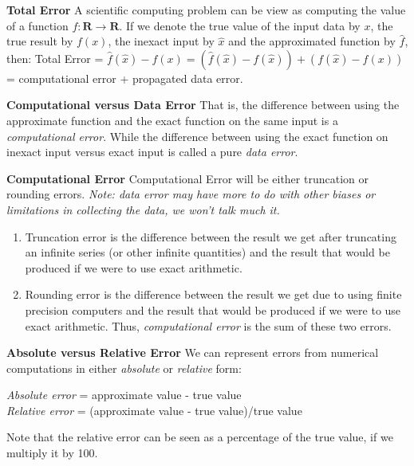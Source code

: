 \documentclass[xcolor=dvipsnames]{beamer}
\begin{document}
\begin{frame}
{\bf Total Error}
A scientific computing problem can be view as computing the value of a function $f: \mathbf{R} \rightarrow \mathbf{R}$.
\vfill
\pause
If we denote the true value of the input data by $x$, the true result by $f(x)$, the inexact input by $\hat{x}$ and the approximated function by $\hat{f}$, then:
\vfill
\pause
Total Error = $\hat{f}(\hat{x}) - f(x) = (\hat{f}(\hat{x}) - f(\hat{x})) + (f(\hat{x}) - f(x))$  = computational error + propagated data error.\\
\end{frame}

\begin{frame}
{\bf Computational versus Data Error}
That is, the difference between using the approximate function and the exact function on the same input is a \emph{computational error}. 
\vfill
\pause
While the difference between using the exact function on inexact input versus exact input is called a pure \emph{data error}.\\
\end{frame}

\begin{frame}
{\bf Computational Error}
Computational Error will be either truncation or rounding errors. {\it Note: data error may have more to do with other biases or limitations in collecting the data, we won't talk much it. } 
\begin{enumerate}
\item{Truncation error} is the difference between the result we get after truncating an infinite series (or other infinite quantities) and the result that would be produced if we were to use exact arithmetic. \item{Rounding error} is the difference between the result we get due to using finite precision computers and the result that would be produced if we were to use exact arithmetic. Thus, \emph{computational error} is the sum of these two errors.\\
\end{enumerate}
\end{frame}

\begin{frame}
{\bf Absolute versus Relative Error}
We can represent errors from numerical computations in either \emph{absolute} or \emph{relative} form:
\pause
\begin{center}
\emph{Absolute error} = approximate value - true value\\
\emph{Relative error} = (approximate value - true value)/true value
\end{center}
\pause
Note that the relative error can be seen as a percentage of the true value, if we multiply it by 100.\\
\end{frame}
\end{document}
